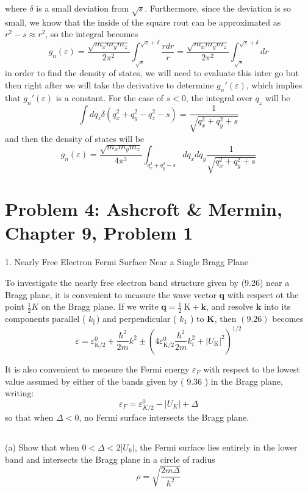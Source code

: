 \documentclass[12pt]{article}
\begin{document}
where $\delta$ is a small deviation from $\sqrt{s}$. Furthermore, since the deviation is so small, we know that the inside of the square rout can be approximated as $r^2 - s \approx r^2$, so the integral becomes
\begin{equation}
    g_n(\varepsilon) = \frac{\sqrt{m_x m_y m_z}}{2 \pi^2}\int_{\sqrt{s}}^{\sqrt{s} + \delta} \frac{rdr}{r} = \frac{\sqrt{m_x m_y m_z}}{2 \pi^2}\int_{\sqrt{s}}^{\sqrt{s} + \delta} dr
\end{equation}
in order to find the density of states, we will need to evaluate this inter go but then right after we will take the derivative to determine $g_n'(\varepsilon)$, which implies that $g_n'(\varepsilon)$ is a constant. For the case of $s < 0$, the integral over $q_z$ will be
\begin{equation}
    \int dq_z \delta\left(q_x^2 + q_y^2 - q_z^2 -s \right) = \frac{1}{\sqrt{q_x^2 + q_y^2 + s}}
\end{equation}
and then the density of states will be
\begin{equation}
    g_n(\varepsilon) = \frac{\sqrt{m_x m_y m_z}}{4 \pi^3}\int_{q_x^2 + q_y^2 -s} dq_x dq_y \frac{1}{\sqrt{q_x^2 + q_y^2 + s}}
\end{equation}
\section{Problem 4: Ashcroft \& Mermin, Chapter 9, Problem 1}
1. Nearly Free Electron Fermi Surface Near a Single Bragg Plane

To investigate the nearly free electron band structure given by (9.26) near a Bragg plane, it is convenient to measure the wave vector $\mathbf{q}$ with respect ot the point $\frac{1}{2} K$ on the Bragg plane. If we write $\mathbf{q}=\frac{1}{2} \mathrm{~K}+\mathbf{k}$, and resolve $\mathbf{k}$ into its components parallel ( $k_{\|}$) and perpendicular ( $k_1$ ) to $\mathbf{K}$, then $(9.26)$ becomes
$$
\varepsilon=\varepsilon_{\mathrm{K} / 2}^0+\frac{\hbar^2}{2 m} k^2 \pm\left(4 \varepsilon_{\mathrm{K} / 2}^0 \frac{\hbar^2}{2 m} k_i^2+\left|U_{\mathrm{K}}\right|^2\right)^{1 / 2}
$$

It is also convenient to measure the Fermi energy $\varepsilon_F$ with respect to the lowest value assumed by either of the bands given by ( 9.36 ) in the Bragg plane, writing:
$$
\varepsilon_F=\varepsilon_{K / 2}^0-\left|U_K\right|+\Delta
$$
so that when $\Delta<0$, no Fermi surface intersects the Bragg plane.
\subsection{}
(a) Show that when $0<\Delta<2\left|U_k\right|$, the Fermi surface lies entirely in the lower band and intersects the Bragg plane in a circle of radius
$$
\rho=\sqrt{\frac{2 m \Delta}{\hbar^2}}
$$
\end{document}
